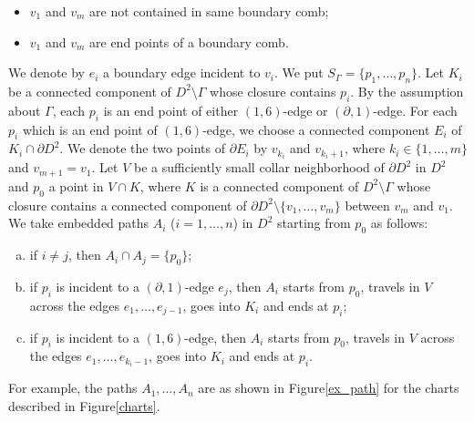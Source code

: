 \documentclass{amsart}
\theoremstyle{plain}
\theoremstyle{definition}
\begin{document}
\begin{itemize}

\item $v_1$ and $v_m$ are not contained in same boundary comb; 

\item $v_1$ and $v_m$ are end points of a boundary comb. 

\end{itemize}
\noindent
We denote by $e_i$ a boundary edge incident to $v_i$.
We put $S_{\Gamma}=\{p_1,\ldots,p_n\}$. 
Let $K_i$ be a connected component of $D^2\setminus\Gamma$ whose closure contains $p_i$. 
By the assumption about $\Gamma$, each $p_i$ is an end point of either $(1,6)$-edge or $(\partial,1)$-edge. 
For each $p_i$ which is an end point of $(1,6)$-edge, we choose a connected component $E_i$ of $K_i\cap\partial D^2$. 
We denote the two points of $\partial E_i$ by $v_{k_i}$ and $v_{k_{i}+1}$, where $k_i\in\{1,\ldots,m\}$ and $v_{m+1}=v_1$. 
Let $V$ be a sufficiently small collar neighborhood of $\partial D^2$ in $D^2$ and $p_0$ a point in $V\cap K$, 
where $K$ is a connected component of $D^2\setminus \Gamma$ whose closure contains a connected component of $\partial D^2\setminus\{v_1,\ldots,v_m\}$ between $v_m$ and $v_1$. 
We take embedded paths $A_i$ ($i=1,\ldots,n$) in $D^2$ starting from $p_0$ as follows: 

\begin{enumerate}[(a)]

\item if $i\neq j$, then $A_i\cap A_j=\{p_0\}$; 

\item if $p_i$ is incident to a $(\partial,1)$-edge $e_j$, then $A_i$ starts from $p_0$, 
travels in $V$ across the edges $e_1,\ldots,e_{j-1}$, goes into $K_i$ and ends at $p_i$; 

\item if $p_i$ is incident to a $(1,6)$-edge, then $A_i$ starts from $p_0$, 
travels in $V$ across the edges $e_1,\ldots,e_{k_{i}-1}$, goes into $K_i$ and ends at $p_i$. 

\end{enumerate}
\noindent
For example, the paths $A_1,\ldots,A_n$ are as shown in Figure\ref{ex_path} for the charts described in Figure\ref{charts}. 
\end{document}
